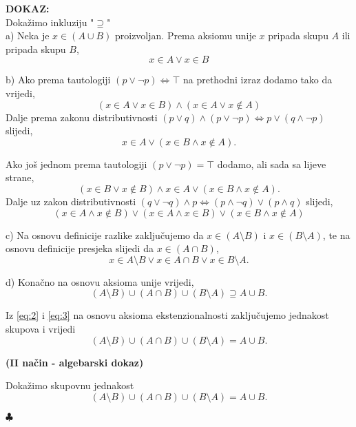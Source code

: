 \documentclass{article}
\newenvironment{dokaz}
    {\noindent\textbf{DOKAZ:}\\} {\hfill $\clubsuit$}
\begin{document}
\begin{dokaz}
    \noindent
    Dokažimo inkluziju "$\supseteq $"\\
    a) Neka je $x\in (A\cup B)$ proizvoljan. Prema aksiomu unije $x$ pripada skupu $A$ ili pripada skupu $B$,
    $$x\in A \vee x\in B$$
    \smallskip

    \noindent
    b) Ako prema tautologiji $(p\vee \lnot p)\Longleftrightarrow\top$ na prethodni izraz dodamo tako da vrijedi,
    $$(x\in A\vee x\in B)\land (x\in A\vee x\notin A)$$
    Dalje prema zakonu distributivnosti $(p\vee q)\land (p\vee \lnot p)\Longleftrightarrow p\vee (q\land \lnot p)$ slijedi,
    $$x\in A\vee (x\in B\land x\notin A).$$
    
    \noindent
    Ako još jednom prema tautologiji $(p\vee \lnot p)=\top$ dodamo, ali sada sa lijeve strane,
    $$(x\in B\vee x\notin B)\land x\in A\vee (x\in B\land x\notin A).$$
    Dalje uz zakon distributivnosti $(q\vee \lnot q)\land p\Longleftrightarrow (p\land \lnot q)\vee (p\land q)$ slijedi,
    $$(x\in A\land x\notin B)\vee (x\in A\land x\in B)\vee (x\in B\land x\notin A)$$
    \smallskip

    \noindent
    c) Na osnovu definicije razlike zaključujemo da $x\in (A\setminus B)$ i $x\in (B\setminus A)$, te na osnovu definicije presjeka slijedi da $x\in (A\cap B)$,
    $$x\in A\setminus B\vee x\in A\cap B\vee x\in B\setminus A.$$
    \smallskip

    \noindent
    d) Konačno na osnovu aksioma unije vrijedi,
    \begin{equation}
        (A\setminus B)\cup (A\cap B)\cup (B\setminus A)\supseteq A\cup B.\label{eq:3}
    \end{equation}
    \medskip

    \noindent
    Iz \eqref{eq:2} i \eqref{eq:3} na osnovu aksioma ekstenzionalnosti zaključujemo jednakost skupova i vrijedi 
    $$(A\setminus B)\cup (A\cap B)\cup (B\setminus A)=A\cup B.$$
    \bigskip

    \noindent
    \textbf{(II način - algebarski dokaz)}
    \smallskip

    \noindent
        Dokažimo skupovnu jednakost
        $$(A\setminus B)\cup (A\cap B)\cup (B\setminus A)=A\cup B.$$


\end{dokaz}
\end{document}
